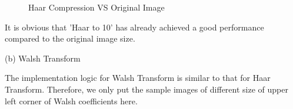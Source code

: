\documentclass[12pt]{article}
\begin{document}
\begin{figure}[H]
    \centering
    \caption{Haar Compression VS Original Image}
    \label{ref_label_overall}
\end{figure}
\begin{flushleft}
It is obvious that 'Haar to 10' has already achieved a good performance compared to the original image size.

(b) Walsh Transform

The implementation logic for Walsh Transform is similar to that for Haar Transform. Therefore, we only put the 
sample images of different size of upper left corner of Walsh coefficients here.
\end{flushleft}
\end{document}
